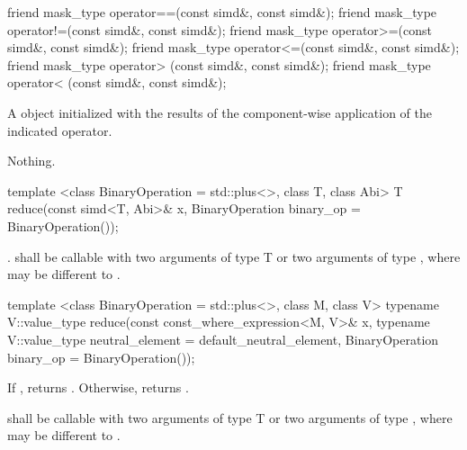 \begin{itemdecl}
friend mask_type operator==(const simd&, const simd&);
friend mask_type operator!=(const simd&, const simd&);
friend mask_type operator>=(const simd&, const simd&);
friend mask_type operator<=(const simd&, const simd&);
friend mask_type operator> (const simd&, const simd&);
friend mask_type operator< (const simd&, const simd&);
\end{itemdecl}
\begin{itemdescr}
  \pnum\returns A \mask object initialized with the results of the component-wise application of the indicated operator.

  \pnum\throws Nothing.
\end{itemdescr}

\begin{itemdecl}
template <class BinaryOperation = std::plus<>, class T, class Abi>
T reduce(const simd<T, Abi>& x, BinaryOperation binary_op = BinaryOperation());
\end{itemdecl}
\begin{itemdescr}
  \pnum\returns {} \foralli.
  \pnum\requires {} shall be callable with two arguments of type \type T or two arguments of type \simd[<T, A1>], where  may be different to .
  \pnum{}
\end{itemdescr}

\begin{itemdecl}
template <class BinaryOperation = std::plus<>, class M, class V>
typename V::value_type reduce(const const_where_expression<M, V>& x,
                              typename V::value_type neutral_element = default_neutral_element,
                              BinaryOperation binary_op = BinaryOperation());
\end{itemdecl}
\begin{itemdescr}
  \pnum\returns
  If , returns .
  Otherwise, returns  .

  \pnum\requires {} shall be callable with two arguments of type \type T or two arguments of type \simd[<T, A1>], where  may be different to .
  \pnum{}
\end{itemdescr}

